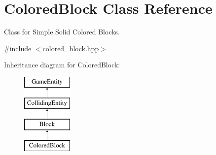 \hypertarget{class_colored_block}{}\section{Colored\+Block Class Reference}
\label{class_colored_block}


Class for Simple Solid Colored Blocks.  




{\ttfamily \#include $<$colored\+\_\+block.\+hpp$>$}

Inheritance diagram for Colored\+Block\+:\begin{figure}[H]
\begin{center}
\leavevmode
\includegraphics[height=4.000000cm]{class_colored_block}
\end{center}
\end{figure}
